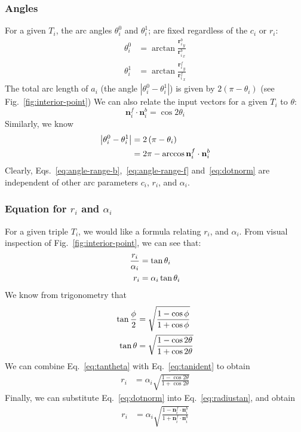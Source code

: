 \documentclass{article}
\begin{document}
\subsubsection{Angles}
%
For a given $T_i$, the arc angles $\theta^0_i$ and $\theta^{1}_{i}$; are fixed regardless of the $c_i$ or $r_{i}$:
%
\begin{align}
  \label{eq:angle-range-b}
  \theta^{0}_{i} &= \arctan \frac{{\mathbf{r}^{b}_{i}}_{y}}{{\mathbf{r}^{b}_{i}}_{x}}\\
  \label{eq:angle-range-f}
  \theta^{1}_{i} &= \arctan \frac{{\mathbf{r}^{f}_{i}}_{y}}{{\mathbf{r}^{f}_{i}}_{x}}
\end{align}
%
The total arc length of $a_i$ (the angle $\left|\theta^0_i -\theta^1_i\right|$) is given by $2\left(\pi-\theta_i\right)$ (see Fig.~\ref{fig:interior-point})
%
We can also relate the input vectors for a given $T_{i}$ to $\theta$:
%
\begin{equation}
  \label{eq:dotnorm}
  \mathbf{n}^{f}_{i} \cdot \mathbf{n}^{b}_{i} = \cos 2\theta_i
\end{equation}
%
Similarly, we know
%
\begin{align}
  \notag
  \left|\theta^0_i -\theta^1_i\right| &= 2\left(\pi-\theta_i\right)\\
  \label{eq:arclen-dot}
  &= 2\pi-\arccos \mathbf{n}^{f}_{i} \cdot \mathbf{n}^{b}_{i}
\end{align}
%
Clearly, Eqs.~\eqref{eq:angle-range-b},~\eqref{eq:angle-range-f} and~\eqref{eq:dotnorm} are independent of other arc parameters $c_{i}$, $r_{i}$, and $\alpha_i$.
%
\subsubsection{Equation for $r_i$ and $\alpha_{i}$}
%
For a given triple $T_{i}$, we would like a formula relating $r_{i}$, and $\alpha_{i}$.  From visual inspection of Fig.~\ref{fig:interior-point}, we can see that:
%
\begin{align}
  \notag
  \frac{r_i}{\alpha_{i}} &= \tan \theta_i\\
  \label{eq:tantheta}
  r_i &= \alpha_{i}\tan \theta_i
\end{align}
%
We know from trigonometry that
%
\begin{align}
  \notag
  \tan \frac{\phi}{2} &= \sqrt{\frac{1-\cos\phi}{1+\cos\phi}}\\
  \label{eq:tanident}
  \tan \theta &= \sqrt{\frac{1-\cos 2\theta}{1+\cos 2\theta}}
\end{align}
%
We can combine Eq.~\eqref{eq:tantheta} with Eq.~\eqref{eq:tanident} to obtain
%
\begin{align}
  \label{eq:radiustan}
  r_{i} &= \alpha_i\sqrt{\frac{1-\cos 2\theta}{1+\cos 2\theta}}
\end{align}
%
Finally, we can substitute Eq.~\eqref{eq:dotnorm} into Eq.~\eqref{eq:radiustan}, and obtain
%
\begin{align}
  \label{eq:radius-alpha}
  r_{i} &= \alpha_i\sqrt{\frac{1-\mathbf{n}^f_i\cdot \mathbf{n}^b_i}{1+\mathbf{n}^f_i\cdot \mathbf{n}^b_i}}
\end{align}
%
\end{document}

